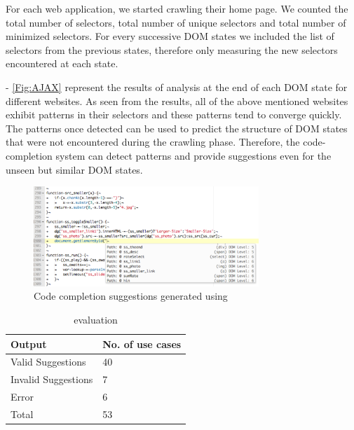 	For each web application, we started crawling their home page. We counted the total number of \css selectors, total number of unique \css selectors and total number of minimized \css selectors. For every successive DOM states we included the list of \css selectors from the previous states, therefore only measuring the new \css selectors encountered at each state. 
	
	 - \ref{Fig:AJAX} represent the results of analysis at the  end of each DOM state for different websites. As seen from the results, all of the above mentioned websites exhibit patterns in their \css selectors and these patterns tend to converge quickly. The patterns once detected can be used to predict the structure of DOM states that were not encountered during the crawling phase. Therefore, the code-completion system can detect patterns and provide suggestions even for the unseen but similar DOM states.
	
	
	
	\begin{figure}
		\centering
		\includegraphics[width=85mm]{images/accuracy.pdf}
		\caption{Code completion suggestions generated using \dompletion}
		\label{Fig:Accuracy}
	\end{figure}
	
	\begin{table}
	{
		\scriptsize
		\begin{tabular}{ p{3.8cm} | p{3.8cm}}
  			\hline                        
  			\textbf{Output} & \textbf{No. of use cases} \\ \hline \hline
  			Valid Suggestions &  40 \\ \hline
			Invalid Suggestions & 7 \\ \hline
			Error & 6 \\ \hline
			Total & 53 \\ 
			\hline  
		\end{tabular}
	}
	\caption {\dompletion evaluation}
	\label{Table:Accuracy}		
	\end{table}
	
